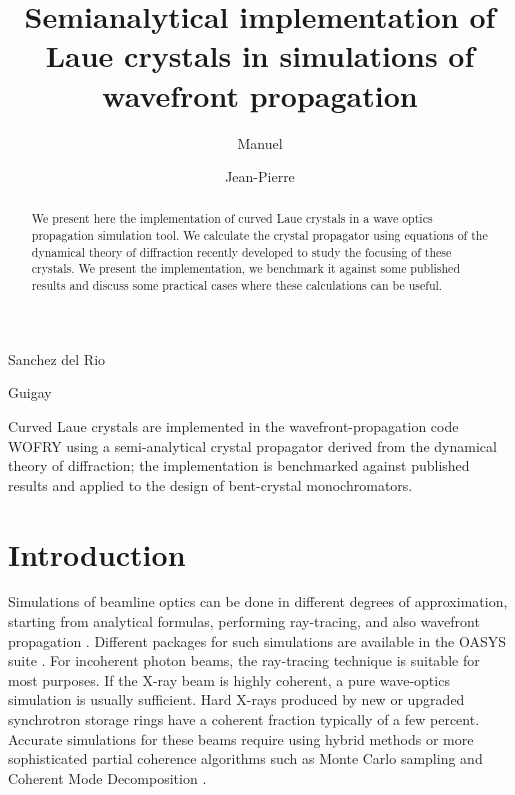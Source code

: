 \documentclass[preprint]{iucr}              %
\begin{document}

\title{Semianalytical implementation of Laue crystals in simulations of wavefront propagation}


\author{Manuel}{Sanchez del Rio}
\author{Jean-Pierre}{Guigay}



\maketitle   %

\begin{synopsis}
Curved Laue crystals are implemented in the wavefront-propagation code WOFRY using a semi-analytical crystal propagator derived from the dynamical theory of diffraction; the implementation is benchmarked against published results and applied to the design of bent-crystal monochromators.
\end{synopsis}

\begin{abstract}

We present here the implementation of curved Laue crystals in a wave optics propagation simulation tool. We calculate the crystal propagator using equations of the dynamical theory of diffraction recently developed \cite{GuigayFerrero2016} to study the focusing of these crystals. We present the implementation, we benchmark it against some published results and discuss some practical cases where these calculations can be useful.

\end{abstract}


%
\section{Introduction}
\label{sec:Intro}

Simulations of beamline optics can be done in different degrees of approximation, starting from analytical formulas, performing ray-tracing, and also wavefront propagation \cite{hyerarchical}. Different packages for such simulations are available in the OASYS suite \cite{codeOASYS}. For incoherent photon beams, the ray-tracing technique is suitable for most purposes.
If the X-ray beam is highly coherent, a pure wave-optics simulation is usually sufficient.
Hard X-rays produced by new or upgraded synchrotron storage rings have a coherent fraction typically of a few percent. Accurate simulations for these beams require using hybrid methods \cite{hybrid} or more sophisticated partial coherence algorithms such as Monte Carlo sampling \cite{Chubar2011b} and Coherent Mode Decomposition \cite{glassEPL}. 
\end{document}
